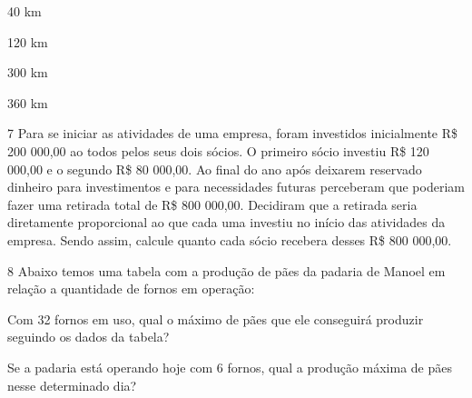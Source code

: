 \begin{escolha}
\item
  40 km
\item
  120 km
\item
  300 km
\item
  360 km
\end{escolha}


\num{7} Para se iniciar as atividades de uma empresa, foram investidos
inicialmente R\$ 200 000,00 ao todos pelos seus dois sócios. O primeiro
sócio investiu R\$ 120 000,00 e o segundo R\$ 80 000,00. Ao final do ano
após deixarem reservado dinheiro para investimentos e para necessidades
futuras perceberam que poderiam fazer uma retirada total de R\$ 800
000,00. Decidiram que a retirada seria diretamente proporcional ao que
cada uma investiu no início das atividades da empresa. Sendo assim,
calcule quanto cada sócio recebera desses R\$ 800 000,00.



\num{8} Abaixo temos uma tabela com a produção de pães da padaria de Manoel
em relação a quantidade de fornos em operação:


\begin{escolha}
\item
  Com 32 fornos em uso, qual o máximo de pães que ele conseguirá
  produzir seguindo os dados da tabela?


\item
  Se a padaria está operando hoje com 6 fornos, qual a produção máxima
  de pães nesse determinado dia?

\end{escolha}

